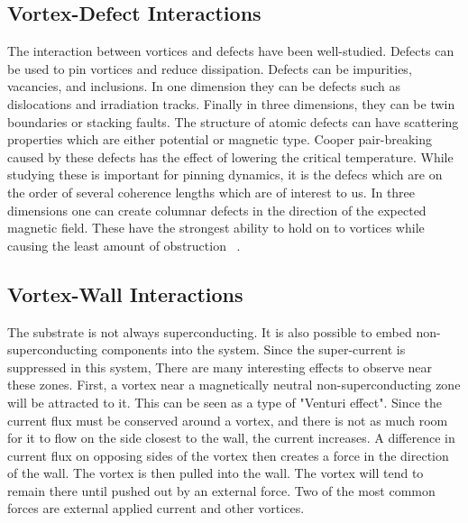 \subsection{Vortex-Defect Interactions}
The interaction between vortices and defects have been well-studied. Defects can be used to pin vortices and reduce dissipation. Defects can be impurities, vacancies, and inclusions. In one dimension they can be defects such as dislocations and irradiation tracks. Finally in three dimensions, they can be twin boundaries or stacking faults. The structure of atomic defects can have scattering properties which are either potential or magnetic type. Cooper pair-breaking caused by these defects has the effect of lowering the critical temperature. While studying these is important for pinning dynamics, it is the defecs which are on the order of several coherence lengths which are of interest to us. In three dimensions one can create columnar defects in the direction of the expected magnetic field. These have the strongest ability to hold on to vortices while causing the least amount of obstruction ~\cite{Kwok16}.

\subsection{Vortex-Wall Interactions}
The substrate is not always superconducting. It is also possible to embed non-superconducting components into the system. Since the super-current is suppressed in this system, There are many interesting effects to observe near these zones. First, a vortex near a magnetically neutral non-superconducting zone will be attracted to it. This can be seen as a type of "Venturi effect". Since the current flux must be conserved around a vortex, and there is not as much room for it to flow on the side closest to the wall, the current increases. A difference in current flux on opposing sides of the vortex then creates a force in the direction of the wall. The vortex is then pulled into the wall. The vortex will tend to remain there until pushed out by an external force. Two of the most common forces are external applied current and other vortices.

